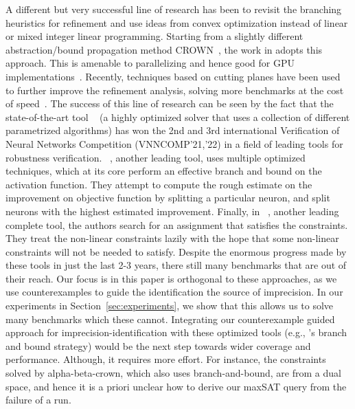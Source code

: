 

\medskip

{A different but very successful line of research has been to revisit the branching heuristics for refinement and 
use ideas from convex optimization instead of linear or mixed integer linear programming. Starting from a slightly 
different abstraction/bound propagation method CROWN~\cite{zhang2018efficient}, the work in \cite{wang2021beta} 
adopts this approach. This is amenable to parallelizing and hence good for GPU implementations~\cite{xu2020fast}. 
Recently, techniques based on cutting planes have been used to further improve the refinement analysis, solving more benchmarks 
at the cost of speed~\cite{zhang2022general}. The success of this line of research can be seen by the fact that the 
state-of-the-art tool \alphabeta{}~\cite{alphabetacrown} (a highly optimized solver that uses a collection of different 
parametrized algorithms) has won the 2nd and 3rd international Verification of Neural Networks Competition (VNNCOMP'21,'22) 
in a field of leading tools for robustness verification. \ovaltool{}~\cite{bunel2020branch}, 
another leading tool, uses multiple optimized techniques, which at its core perform an effective branch and bound on 
the \relu{} activation function. They attempt to compute the rough estimate on the improvement on objective function by 
splitting a particular neuron, and split neurons with the highest estimated improvement. 
Finally, in \marabou{}~\cite{katz2019marabou}, another leading complete tool, the authors search for an assignment that 
satisfies the constraints. They treat the non-linear constraints lazily with the hope that some non-linear constraints 
will not be needed to satisfy. Despite the enormous progress made by these tools in just the last 2-3 years, 
there still many benchmarks that are out of their reach. %
Our focus is in this paper is orthogonal to these approaches, as we use counterexamples to guide the identification 
the source of imprecision. In our experiments in Section~\ref{sec:experiments}, 
we show that this allows us to solve many benchmarks which these cannot. 
{\color{red}
Integrating our counterexample guided approach  for imprecision-identification with these optimized 
tools (e.g., \alphabeta{}'s branch and bound strategy) would be the next step 
towards wider coverage and performance. Although, it requires more effort. For instance, the constraints solved by 
alpha-beta-crown, which also uses branch-and-bound, are from a dual space, and hence it is a priori unclear how to derive 
our maxSAT query from the failure of a run.
}

}
